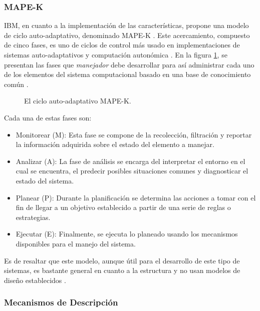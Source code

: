 \documentclass[12pt]{article}
\begin{document}
\subsubsection*{MAPE-K}


IBM, en cuanto a la implementación de las características, propone una modelo de ciclo auto-adaptativo, denominado MAPE-K \cite{Krikava2013}. Este acercamiento, compuesto de cinco fases, es uno de ciclos de control más usado en implementaciones de sistemas auto-adaptativos y computación autonómica \cite{Arcaini_2015}. En la figura \ref{fig:mapek}, se presentan las fases que \textit{manejador} debe desarrollar para así administrar cada uno de los elementos del sistema computacional basado en una base de conocimiento común \cite{alessandra_2010}.

\begin{figure}[H]
	\centering
	
	\caption{El ciclo auto-adaptativo MAPE-K.} \cite{alessandra_2010}
	\label{fig:mapek}
\end{figure}

Cada una de estas fases son:

\begin{itemize}
	\item Monitorear (M): Esta fase se compone de la recolección, filtración y reportar la información adquirida sobre el estado del elemento a manejar.
	\item Analizar (A): La fase de análisis se encarga del interpretar el entorno en el cual se encuentra, el predecir posibles situaciones comunes y diagnosticar el estado del sistema.
	\item Planear (P): Durante la planificación se determina las acciones a tomar con el fin de llegar a un objetivo establecido a partir de una serie de reglas o estrategias.
	\item Ejecutar (E): Finalmente, se ejecuta lo planeado usando los mecanismos disponibles para el manejo del sistema.
\end{itemize}

Es de resaltar que este modelo, aunque útil para el desarrollo de este tipo de sistemas, es bastante general en cuanto a la estructura y no usan modelos de diseño establecidos \cite{Ouareth_2018}.

\subsubsection*{Mecanismos de Descripción}
\end{document}
